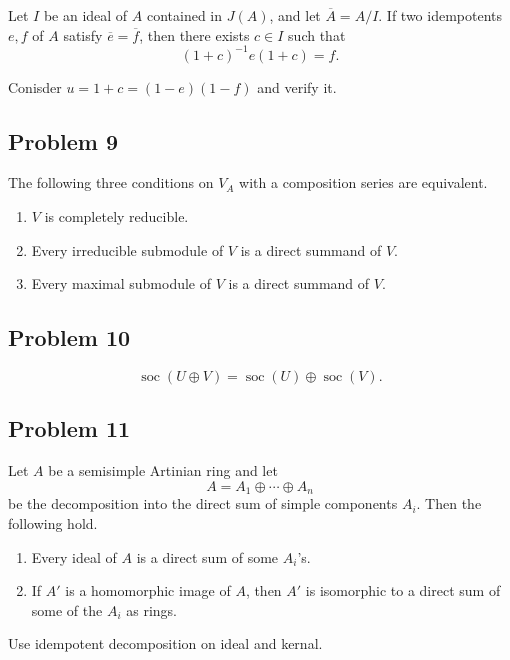 Let \(I\) be an ideal of \(A\) contained in \(J(A)\), and let
\(\overline{A}=A/I\). If two idempotents \(e,f\) of \(A\) satisfy
\(\overline{e}=\overline{f}\), then there exists \(c\in I\) such that
\[
(1+c)^{-1}e(1+c)=f.
\]
\begin{solution}
    Conisder $u=1+c =(1-e)(1-f)$ and verify it.
\end{solution}

\subsection{Problem 9}

The following three conditions on \(V_A\) with a composition series are
equivalent.

\begin{enumerate}
    \item[(1)] \(V\) is completely reducible.
    \item[(2)] Every irreducible submodule of \(V\) is a direct summand of \(V\).
    \item[(3)] Every maximal submodule of \(V\) is a direct summand of \(V\).
\end{enumerate}




\subsection{Problem 10}

\[
\operatorname{soc}(U\oplus V)=\operatorname{soc}(U)\oplus \operatorname{soc}(V).
\]

\subsection{Problem 11}

Let \(A\) be a semisimple Artinian ring and let
\[
A=A_1\oplus \cdots \oplus A_n
\]
be the decomposition into the direct sum of simple components \(A_i\). Then the
following hold.

\begin{enumerate}
    \item[(i)] Every ideal of \(A\) is a direct sum of some \(A_i\)'s.
    \item[(ii)] If \(A'\) is a homomorphic image of \(A\), then \(A'\) is
    isomorphic to a direct sum of some of the \(A_i\) as rings.
\end{enumerate}
\begin{solution}
    Use idempotent decomposition on ideal and kernal.
\end{solution}



